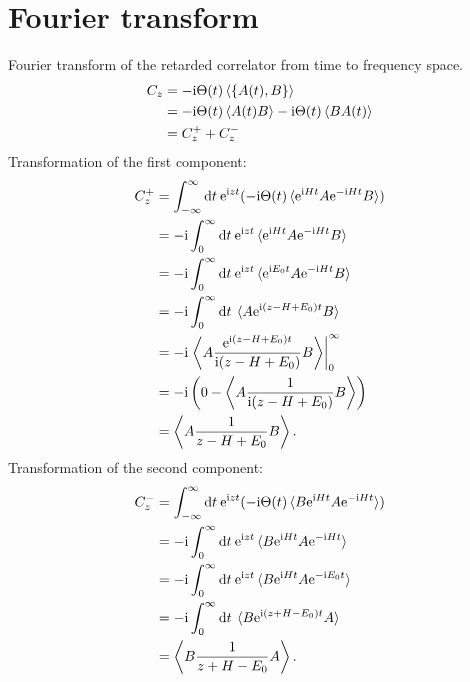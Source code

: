 
\chapter{Fourier transform}
\label{app:fourier-transform}

Fourier transform of the retarded correlator from time to frequency space.
\begin{align}
    C_z
     & =
    -\mathrm{i} \Theta(t) \braket{\{A(t), B\}}                           \\
     & =
    -\mathrm{i} \Theta(t) \braket{A(t) B} -\mathrm{i} \Theta(t) \braket{B A(t)} \\
     & =
    C^+_z + C^-_z
\end{align}
Transformation of the first component:
\begin{align}
    C^+_z
     & =
    \int_{-\infty}^\infty \mathrm{d} t \>
    \mathrm{e}^{\mathrm{i} zt}(-\mathrm{i} \Theta(t) \braket{\mathrm{e}^{\mathrm{i} Ht} A \mathrm{e}^{-\mathrm{i} Ht} B}) \\
     & =
    -\mathrm{i} \int_0^\infty \mathrm{d} t \>
    \mathrm{e}^{\mathrm{i} zt} \braket{\mathrm{e}^{\mathrm{i} Ht} A \mathrm{e}^{-\mathrm{i} Ht} B}                 \\
     & =
    -\mathrm{i} \int_0^\infty \mathrm{d} t \>
    \mathrm{e}^{\mathrm{i} zt} \braket{\mathrm{e}^{\mathrm{i} E_0t} A \mathrm{e}^{-\mathrm{i} Ht} B}               \\
     & =
    -\mathrm{i} \int_0^\infty \mathrm{d} t \>
    \braket{A \mathrm{e}^{\mathrm{i}(z - H + E_0)t} B}                                 \\
     & =
    -\mathrm{i} \left.\Braket{A \frac{\mathrm{e}^{\mathrm{i}(z - H + E_0)t}}{\mathrm{i}(z - H + E_0)} B}
    \right|_0^\infty                                                     \\
     & =
    -\mathrm{i} \left(0 - \Braket{A \frac{1}{\mathrm{i}(z - H + E_0)} B}\right)        \\
     & =
    \Braket{A \frac{1}{z - H + E_0} B}.
\end{align}
Transformation of the second component:
\begin{align}
    C^-_z
     & =
    \int_{-\infty}^\infty \mathrm{d} t \>
    \mathrm{e}^{\mathrm{i} zt}(-\mathrm{i} \Theta(t) \braket{B \mathrm{e}^{\mathrm{i} Ht} A \mathrm{e}^{-\mathrm{i} Ht}}) \\
     & =
    -\mathrm{i} \int_0^\infty \mathrm{d} t \>
    \mathrm{e}^{\mathrm{i} zt} \braket{B \mathrm{e}^{\mathrm{i} Ht} A \mathrm{e}^{-\mathrm{i} Ht}}                 \\
     & =
    -\mathrm{i} \int_0^\infty \mathrm{d} t \>
    \mathrm{e}^{\mathrm{i} zt} \braket{B \mathrm{e}^{\mathrm{i} Ht} A \mathrm{e}^{-\mathrm{i} E_0t}}               \\
     & =
    -\mathrm{i} \int_0^\infty \mathrm{d} t \>
    \braket{B \mathrm{e}^{\mathrm{i}(z + H - E_0)t} A}                                 \\
     & =
    \Braket{B \frac{1}{z + H - E_0} A}.
\end{align}
